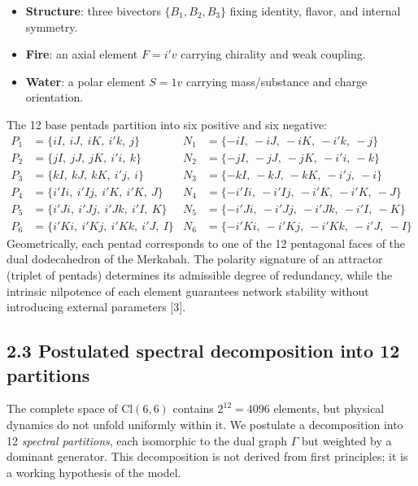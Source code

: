 \documentclass[11pt]{article}
\providecommand{\tightlist}{\setlength{\itemsep}{2pt}\setlength{\parskip}{6pt}}
\providecommand{\tightlist}{%
  \setlength{\itemsep}{2pt}\setlength{\parskip}{6pt}
}
\begin{document}
\begin{itemize}
\tightlist
\item
  \textbf{Structure}: three bivectors \(\{B_1, B_2, B_3\}\) fixing
  identity, flavor, and internal symmetry.
\item
  \textbf{Fire}: an axial element \(F = i'v\) carrying chirality and
  weak coupling.
\item
  \textbf{Water}: a polar element \(S = 1v\) carrying mass/substance and
  charge orientation.
\end{itemize}

The 12 base pentads partition into six positive and six negative: \[
\begin{aligned}
P_1  &= \{iI,\ iJ,\ iK,\ i'k,\ j\}  & N_1  &= \{-iI,\ -iJ,\ -iK,\ -i'k,\ -j\} \\
P_2  &= \{jI,\ jJ,\ jK,\ i'i,\ k\}  & N_2  &= \{-jI,\ -jJ,\ -jK,\ -i'i,\ -k\} \\
P_3  &= \{kI,\ kJ,\ kK,\ i'j,\ i\}  & N_3  &= \{-kI,\ -kJ,\ -kK,\ -i'j,\ -i\} \\
P_4  &= \{i'Ii,\ i'Ij,\ i'K,\ i'K,\ J\}  & N_4  &= \{-i'Ii,\ -i'Ij,\ -i'K,\ -i'K,\ -J\} \\
P_5  &= \{i'Ji,\ i'Jj,\ i'Jk,\ i'I,\ K\}  & N_5  &= \{-i'Ji,\ -i'Jj,\ -i'Jk,\ -i'I,\ -K\} \\
P_6  &= \{i'Ki,\ i'Kj,\ i'Kk,\ i'J,\ I\}  & N_6  &= \{-i'Ki,\ -i'Kj,\ -i'Kk,\ -i'J,\ -I\}
\end{aligned}
\] Geometrically, each pentad corresponds to one of the 12 pentagonal
faces of the dual dodecahedron of the Merkabah. The polarity signature
of an attractor (triplet of pentads) determines its admissible degree of
redundancy, while the intrinsic nilpotence of each element guarantees
network stability without introducing external parameters {[}3{]}.

\hypertarget{postulated-spectral-decomposition-into-12-partitions}{%
\subsection{2.3 Postulated spectral decomposition into 12
partitions}\label{postulated-spectral-decomposition-into-12-partitions}}

The complete space of \(\text{Cl}(6,6)\) contains \(2^{12}=4096\)
elements, but physical dynamics do not unfold uniformly within it. We
postulate a decomposition into 12 \emph{spectral partitions}, each
isomorphic to the dual graph \(\Gamma\) but weighted by a dominant
generator. This decomposition is not derived from first principles; it
is a working hypothesis of the model.
\end{document}
